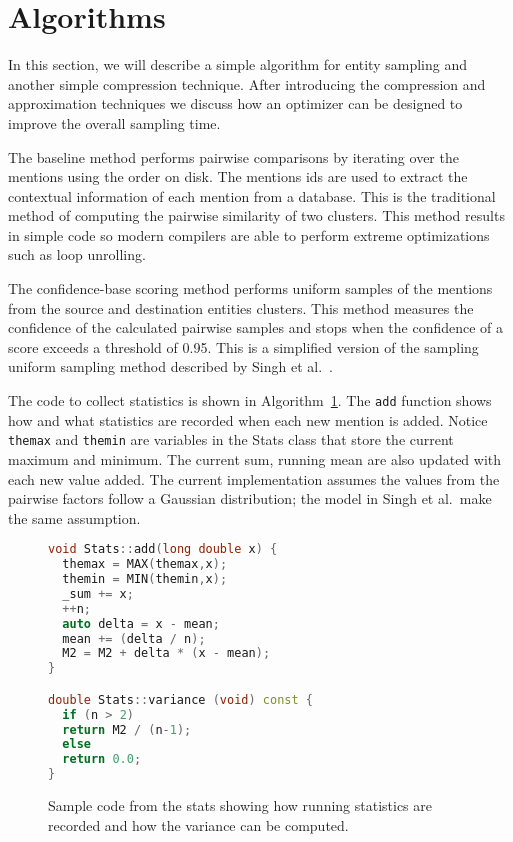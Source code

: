 

\section{Algorithms}
\label{sec:optimizer:algorithms}

In this section, we will describe a simple algorithm for entity sampling and
another simple compression technique.
After introducing the compression and approximation techniques we discuss how
an optimizer can be designed to improve the overall sampling time.

The baseline method performs pairwise comparisons by 
iterating over the mentions using the order on disk.
The mentions ids are used to extract the contextual information of each mention from a database.
This is the traditional method of computing the pairwise similarity of two clusters. 
This method results in simple code so modern compilers are able to perform extreme
optimizations such as loop unrolling.

The confidence-base scoring method performs uniform samples of the
mentions from the source and destination entities clusters. This method
measures the confidence of the calculated pairwise samples and stops when the
confidence of a score exceeds a threshold of 0.95.
This is a simplified version of the sampling uniform sampling method described by Singh et al.~\cite{singh2012monte}.

The code to collect statistics is shown in Algorithm~\ref{algo:stats}.
The \texttt{add} function shows how and what statistics are recorded when each new mention is added.
Notice \texttt{themax} and \texttt{themin} are variables in the Stats class that
store the current maximum and minimum.
The current sum, running mean are also updated with each new value added.
The current implementation assumes the values from the pairwise factors follow a Gaussian distribution;
the model in Singh et al.\ make the same assumption.

\begin{figure}
\centering
\begin{lstlisting}[language=c++,breaklines=true,keywordstyle=\color{blue},stringstyle=\color{red},commentstyle=\color{green}]
void Stats::add(long double x) {
  themax = MAX(themax,x);
  themin = MIN(themin,x);
  _sum += x;                   
  ++n;
  auto delta = x - mean;       
  mean += (delta / n);         
  M2 = M2 + delta * (x - mean);
} 

double Stats::variance (void) const {
  if (n > 2)  
  return M2 / (n-1);
  else
  return 0.0;
} 

\end{lstlisting}
\caption{Sample code from the stats showing how running statistics are recorded and how the variance can be computed.}
\label{algo:stats}
\end{figure}


